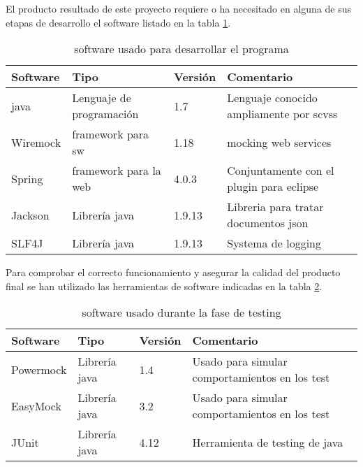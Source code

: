 El producto resultado de este proyecto requiere o ha necesitado en alguna de sus etapas de desarrollo el \gls{software} listado en la tabla \ref{table:softdevsw}.

\begin{center}
\begin {table}[H]
\centering
    \begin{tabular}{ | p{3cm}  p{4cm}   p{3cm}   p{5cm} |}
    \hline
    \textbf{Software} & \textbf{Tipo} & \textbf{Versión} & \textbf{Comentario} \\ \hline
    \Gls{java} & Lenguaje de programación & 1.7 & Lenguaje conocido ampliamente por \gls{scvss} \\ \hline
    Wiremock & \Gls{framework} para \gls{sw} & 1.18 & \Gls{mocking} web services \\ \hline
    Spring & \Gls{framework} para la web& 4.0.3 & Conjuntamente con el \gls{plugin} para \gls{eclipse} \\ \hline
    Jackson & Librería \Gls{java}& 1.9.13& Libreria para tratar documentos \gls{json} \\ \hline
    SLF4J & Librería \Gls{java}& 1.9.13& Systema de \gls{logging} \\ \hline
    \end{tabular}
    \caption{\Gls{software} usado para desarrollar el programa}
    \label{table:softdevsw}
  \end{table}
\end{center}

Para comprobar el correcto funcionamiento y asegurar la calidad del producto final se han utilizado las herramientas de \gls{software} indicadas en la tabla \ref{table:softtest}.

\begin{center}
\begin {table}[H]
\centering
    \begin{tabular}{ | p{3cm}  p{4cm}   p{3cm}   p{5cm} |}
    \hline
    \textbf{Software} & \textbf{Tipo} & \textbf{Versión} & \textbf{Comentario} \\ \hline
    Powermock & Librería \Gls{java} & 1.4 & Usado para simular comportamientos en los test \\ \hline
    EasyMock & Librería \Gls{java} & 3.2 & Usado para simular comportamientos en los test \\ \hline
    JUnit & Librería \Gls{java}  & 4.12& Herramienta de \gls{testing}  de \Gls{java} \\ \hline
    \end{tabular}
    \caption{\Gls{software} usado durante la fase de \gls{testing}}
    \label{table:softtest}
  \end{table}
\end{center}

